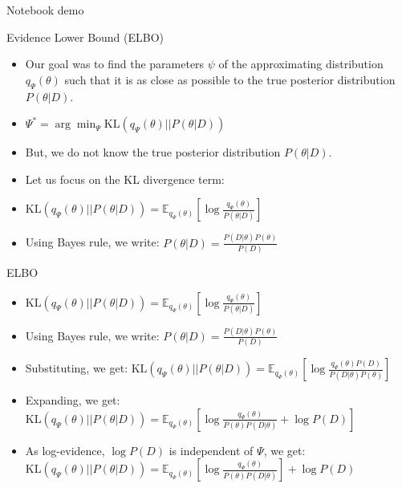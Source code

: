 \documentclass{beamer}
\begin{document}
\begin{frame}
    Notebook demo
\end{frame}

\begin{frame}{Evidence Lower Bound (ELBO)}
    \begin{itemize}
        \item Our goal was to find the parameters $\psi$ of the approximating distribution $q_{\Psi}(\theta)$ such that it is as close as possible to the true posterior distribution $P(\theta|D)$.
        \item \pause $\Psi^* = \arg\min_{\Psi} \text{KL}(q_{\Psi}(\theta)||P(\theta|D))$
        \item \pause But, we do not know the true posterior distribution $P(\theta|D)$. 
        \item \pause Let us focus on the KL divergence term:
        \item \pause $\text{KL}(q_{\Psi}(\theta)||P(\theta|D)) =  \mathbb{E}_{q_{\Psi}(\theta)} \left[ \log \frac{q_{\Psi}(\theta)}{P(\theta|D)} \right]$
        \item \pause Using Bayes rule, we write: $P(\theta|D) = \frac{P(D|\theta)P(\theta)}{P(D)}$
    \end{itemize}
    
    
\end{frame}

\begin{frame}{ELBO}
    \begin{itemize}
        \item $\text{KL}(q_{\Psi}(\theta)||P(\theta|D)) =  \mathbb{E}_{q_{\Psi}(\theta)} \left[ \log \frac{q_{\Psi}(\theta)}{P(\theta|D)} \right]$
        \item Using Bayes rule, we write: $P(\theta|D) = \frac{P(D|\theta)P(\theta)}{P(D)}$
        \item \pause Substituting, we get: $\text{KL}(q_{\Psi}(\theta)||P(\theta|D)) =  \mathbb{E}_{q_{\Psi}(\theta)} \left[ \log \frac{q_{\Psi}(\theta)P(D)}{P(D|\theta)P(\theta)} \right]$
        \item \pause Expanding, we get: $\text{KL}(q_{\Psi}(\theta)||P(\theta|D)) =  \mathbb{E}_{q_{\Psi}(\theta)} \left[ \log \frac{q_{\Psi}(\theta)}{P(\theta)P(D|\theta)} + \log P(D) \right]$
        \item \pause As log-evidence, $\log P(D)$ is independent of $\Psi$, we get: $\text{KL}(q_{\Psi}(\theta)||P(\theta|D)) =  \mathbb{E}_{q_{\Psi}(\theta)} \left[ \log \frac{q_{\Psi}(\theta)}{P(\theta)P(D|\theta)} \right] + \log P(D)$
    \end{itemize}
    
\end{frame}
\end{document}
